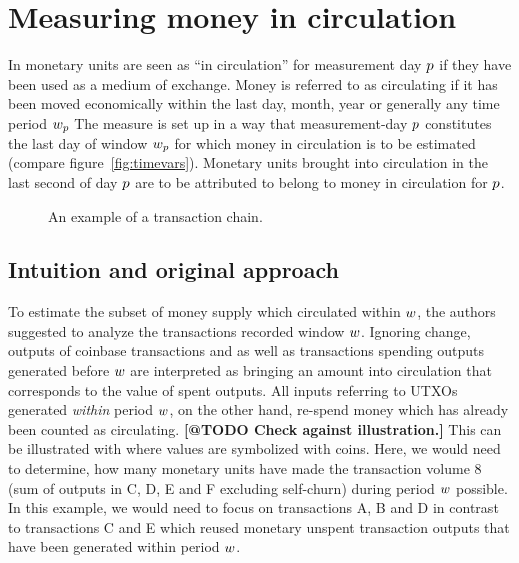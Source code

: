 \section{Measuring money in circulation}
\label{sec:measure}%

In \cite{pernice2019cryptocurrencies} monetary units are seen as ``in circulation'' for measurement day \({p}\)
if they have been used as a medium of exchange. %
Money is referred to as circulating if it has been moved economically within the last day, month, year or generally any time period ${w}_{p}$%
The measure is set up in a way that measurement-day \({p}\) constitutes the last day of window \({w}_{p}\) for which money in circulation is to be estimated (compare figure~\ref{fig:timevars}). %
Monetary units brought into circulation in the last second of day \({p}\) are to be attributed to belong to money in circulation for \({p}\). %

\begin{figure*}[ht!]%
	\centering
	\ifdefined\varInputFigs%
	
	\else%
	\fi%
	\caption{%
		An example of a transaction chain. %
	}%
	\label{fig:mcirc_concept}%
\end{figure*}%


\subsection{Intuition and original approach}
\label{sec:orig_approach}%
To estimate the subset of money supply which circulated within ${w}$, the authors suggested to analyze the transactions recorded window ${w}$.  %
Ignoring change, outputs of coinbase transactions and as well as transactions spending outputs generated before ${w}$ are interpreted as bringing an amount into circulation that corresponds to the value of spent outputs.  %
All inputs referring to UTXOs generated \emph{within} period ${w}$, on the
other hand, re-spend money which has already been counted as circulating.%
%
\textbf{[@TODO Check against illustration.]}
This can be illustrated with  where values are symbolized with coins. %
Here, we would need to determine, how many monetary units have made the transaction volume $8$ (sum of outputs in C, D, E and F excluding self-churn) during period ${w}$ possible. %
In this example, we would need to focus on transactions A, B and D in contrast to transactions C and E which reused monetary unspent transaction outputs that have been generated within period ${w}$. %

